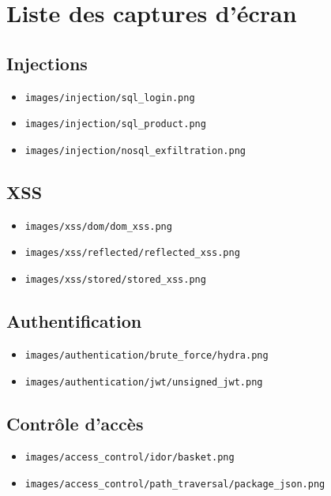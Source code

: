 
\chapter{Liste des captures d'écran}

\section{Injections}
\begin{itemize}
    \item \texttt{images/injection/sql\_login.png}
    \item \texttt{images/injection/sql\_product.png}
    \item \texttt{images/injection/nosql\_exfiltration.png}
\end{itemize}

\section{XSS}
\begin{itemize}
    \item \texttt{images/xss/dom/dom\_xss.png}
    \item \texttt{images/xss/reflected/reflected\_xss.png}
    \item \texttt{images/xss/stored/stored\_xss.png}
\end{itemize}

\section{Authentification}
\begin{itemize}
    \item \texttt{images/authentication/brute\_force/hydra.png}
    \item \texttt{images/authentication/jwt/unsigned\_jwt.png}
\end{itemize}

\section{Contrôle d'accès}
\begin{itemize}
    \item \texttt{images/access\_control/idor/basket.png}
    \item \texttt{images/access\_control/path\_traversal/package\_json.png}
\end{itemize}
